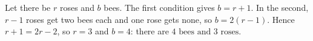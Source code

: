 Let there be $r$ roses and $b$ bees. The first condition gives $b=r+1$. In the second, $r-1$ roses get two bees each and one rose gets none, so $b=2(r-1)$. Hence $r+1=2r-2$, so $r=3$ and $b=4$: there are $\boxed{4\text{ bees and }3\text{ roses}}$.
